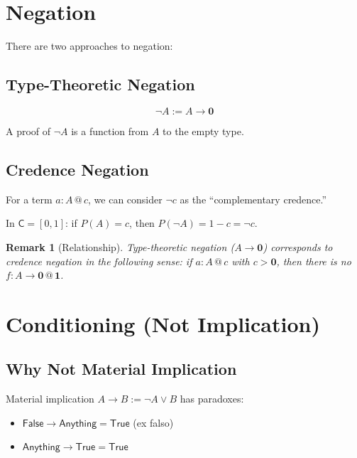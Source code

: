 \documentclass[11pt,a4paper]{article}
\makeatletter
\newtheorem{remark}{Remark}[section]
\newcommand{\C}{\mathsf{C}}
\newcommand{\at}[1]{\,@\,#1}
\newcommand{\one}{\mathbf{1}}
\newcommand{\zero}{\mathbf{0}}
\newcommand{\negc}{\neg}
\makeatother
\begin{document}
\section{Negation}

There are two approaches to negation:

\subsection{Type-Theoretic Negation}

\[
\neg A := A \to \mathbf{0}
\]

A proof of $\neg A$ is a function from $A$ to the empty type.

\subsection{Credence Negation}

For a term $a : A \at{c}$, we can consider $\negc c$ as the ``complementary credence.''

In $\C = {[0,1]}$: if $P(A) = c$, then $P(\neg A) = 1 - c = \negc c$.

\begin{remark}[Relationship]
Type-theoretic negation ($A \to \mathbf{0}$) corresponds to credence negation in the following sense: if $a : A \at{c}$ with $c > \zero$, then there is no $f : A \to \mathbf{0} \at{\one}$.
\end{remark}

\section{Conditioning (Not Implication)}

\subsection{Why Not Material Implication}

Material implication $A \to B := \negc A \vee B$ has paradoxes:
\begin{itemize}
    \item $\mathsf{False} \to \mathsf{Anything} = \mathsf{True}$ (ex falso)
    \item $\mathsf{Anything} \to \mathsf{True} = \mathsf{True}$
\end{itemize}
\end{document}
